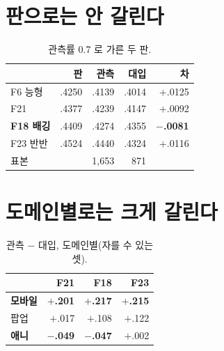 \documentclass[10pt]{article}
\begin{document}

\section{판으로는 안 갈린다}

\begin{table}[t]
\centering\tsize
\caption{관측률 0.7 로 가른 두 판.}
\begin{tabular}{lrrrr}
\toprule
& 판 & 관측 & 대입 & 차 \\
\midrule
F6 능형 & .4250 & .4139 & .4014 & $+$.0125 \\
F21 & .4377 & .4239 & .4147 & $+$.0092 \\
\textbf{F18 배깅} & .4409 & .4274 & .4355 & \textbf{$-$.0081} \\
F23 반반 & .4524 & .4440 & .4324 & $+$.0116 \\
\midrule
\multicolumn{2}{l}{표본} & 1{,}653 & 871 & \\
\bottomrule
\end{tabular}
\end{table}


\section{도메인별로는 크게 갈린다}

\begin{table}[t]
\centering\tsize
\caption{관측 $-$ 대입, 도메인별(자를 수 있는 셋).}
\begin{tabular}{lrrr}
\toprule
& F21 & F18 & F23 \\
\midrule
\textbf{모바일} & \textbf{$+$.201} & \textbf{$+$.217} & \textbf{$+$.215} \\
팝업 & $+$.017 & $+$.108 & $+$.122 \\
\textbf{애니} & \textbf{$-$.049} & \textbf{$-$.047} & $+$.002 \\
\bottomrule
\end{tabular}
\end{table}
\end{document}
